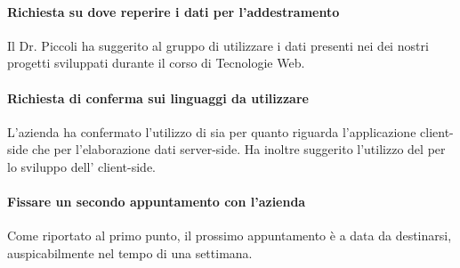 \documentclass{article}
\begin{document}
\paragraph*{Richiesta su dove reperire i dati per l'addestramento}
Il Dr. Piccoli ha suggerito al gruppo di utilizzare i dati presenti nei  dei nostri progetti sviluppati durante il corso di Tecnologie Web.

\paragraph*{Richiesta di conferma sui linguaggi da utilizzare}
L'azienda ha confermato l'utilizzo di  sia per
quanto riguarda l'applicazione client-side che per l'elaborazione dati server-side. Ha inoltre suggerito l'utilizzo del   per lo sviluppo dell' client-side.

\paragraph*{Fissare un secondo appuntamento con l'azienda}
Come riportato al primo punto, il prossimo appuntamento è a data da destinarsi, auspicabilmente  nel tempo di una settimana.
\end{document}
